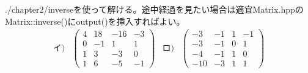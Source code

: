 \documentclass{jsarticle}
\begin{document}
\section{} %
./chapter2/inverseを使って解ける。途中経過を見たい場合は適宜Matrix.hppのMatrix::inverse()にoutput()を挿入すればよい。
\[
	\begin{array}{rrrr}
		イ) &
		\left(
			\begin{array}{rrrr}
				4 & 18 & -16 & -3\\
				0 & -1 &   1 &  1\\
				1 &  3 &  -3 &  0\\
				1 &  6 &  -5 & -1
			\end{array}
		\right) &
		ロ) &
		\left(
			\begin{array}{rrrr}
				 -3 & -1 & 1 & -1\\
				 -3 & -1 & 0 &  1\\
				 -4 & -1 & 1 &  0\\
				-10 & -3 & 1 &  1
			\end{array}
		\right)
	\end{array}
\]
\end{document}
